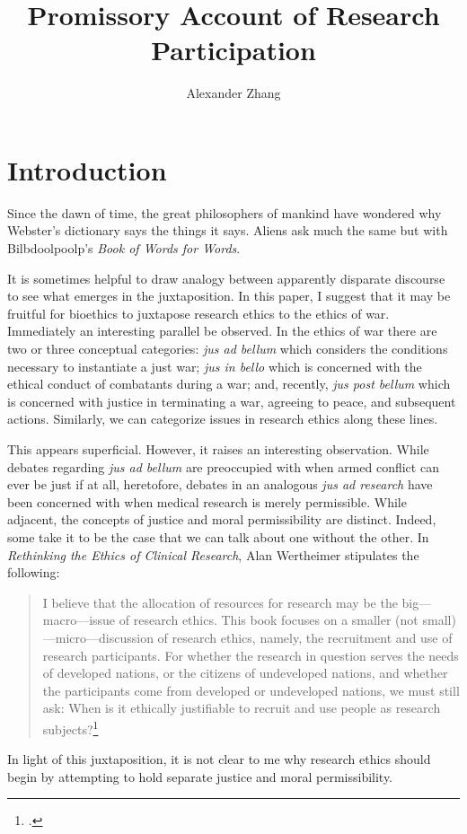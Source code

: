 \documentclass[letterpaper,notitlepage,12pt]{article}
\title{Promissory Account of Research Participation}
\author{Alexander Zhang}
\date{}
\begin{document}
\maketitle

\section{Introduction}

Since the dawn of time, the great philosophers of mankind have wondered why
Webster's dictionary says the things it says.
Aliens ask much the same but with Bilbdoolpoolp's \textit{Book of Words for
Words}.

It is sometimes helpful to draw analogy between apparently disparate discourse
to see what emerges in the juxtaposition.
In this paper, I suggest that it may be fruitful for bioethics to juxtapose
research ethics to the ethics of war.
Immediately an interesting parallel be observed.
In the ethics of war there are two or three conceptual categories: \textit{
jus ad bellum} which considers the conditions necessary to instantiate a just
war; \textit{jus in bello} which is concerned with the ethical conduct of
combatants during a war; and, recently, \textit{jus post bellum} which is
concerned with justice in terminating a war, agreeing to peace, and subsequent
actions.
Similarly, we can categorize issues in research ethics along these lines.

This appears superficial.
However, it raises an interesting observation.
While debates regarding \textit{jus ad bellum} are preoccupied with when armed
conflict can ever be just if at all, heretofore, debates in an analogous
\textit{jus ad research} have been concerned with when medical research is
merely permissible.
While adjacent, the concepts of justice and moral permissibility are distinct.
Indeed, some take it to be the case that we can talk about one without the
other.
In \textit{Rethinking the Ethics of Clinical Research}, Alan Wertheimer
stipulates the following: \begin{quotation}
I believe that the allocation of resources for research may be the
big---macro---issue of research ethics. This book focuses on a smaller (not
small)---micro---discussion of research ethics, namely, the recruitment and use
of research participants. For whether the research in question serves the needs
of developed nations, or the citizens of undeveloped nations, and whether the
participants come from developed or undeveloped nations, we must still ask: When
is it ethically justifiable to recruit and use people as research
subjects?\footcite[p. 8]{wertheimer_rethinking_2011}
\end{quotation}
In light of this juxtaposition, it is not clear to me why research ethics should
begin by attempting to hold separate justice and moral permissibility.
\end{document}
